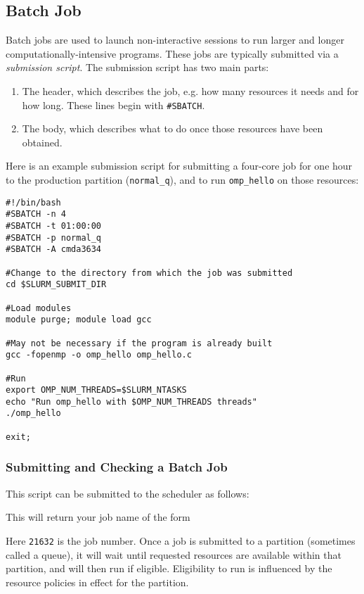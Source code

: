 \subsection{Batch Job}
Batch jobs are used to launch non-interactive sessions to run larger and longer computationally-intensive programs. These jobs are typically submitted via a \emph{submission script}. The submission script has two main parts:
\begin{enumerate}
	\item The header, which describes the job, e.g. how many resources it needs and for how long. These lines begin with \texttt{\#SBATCH}.
	\item The body, which describes what to do once those resources have been obtained.
\end{enumerate}
Here is an example submission script for submitting a four-core job for one hour to the production partition (\texttt{normal\_q}), and to run \texttt{omp\_hello} on those resources:

%
\begin{verbatim}
#!/bin/bash
#SBATCH -n 4
#SBATCH -t 01:00:00
#SBATCH -p normal_q
#SBATCH -A cmda3634

#Change to the directory from which the job was submitted
cd $SLURM_SUBMIT_DIR

#Load modules
module purge; module load gcc

#May not be necessary if the program is already built
gcc -fopenmp -o omp_hello omp_hello.c

#Run
export OMP_NUM_THREADS=$SLURM_NTASKS
echo "Run omp_hello with $OMP_NUM_THREADS threads"
./omp_hello

exit;
\end{verbatim}



\subsubsection{Submitting and Checking a Batch Job}
This script can be submitted to the scheduler as follows:

This will return your job name of the form


Here \texttt{21632} is the job number. Once a job is submitted to a partition (sometimes called a queue), it will wait until requested resources are available within that partition, and will then run if eligible. Eligibility to run is influenced by the resource policies in effect for the partition.

